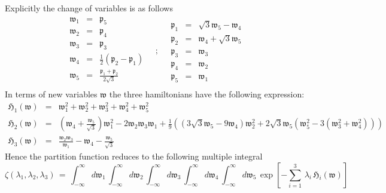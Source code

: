 \documentclass[10pt,a4paper]{article}
\begin{document}
 Explicitly the change of variables is as follows
 \begin{equation}\label{farfullo}
   \begin{array}{ccc}
      \mathfrak{w}_1 & = & \mathfrak{p}_5 \\
      \mathfrak{w}_2 & = & \mathfrak{p}_4 \\
      \mathfrak{w}_3 & = & \mathfrak{p}_3 \\
      \mathfrak{w}_4 & = & \frac{1}{2} \left(\mathfrak{p}_2-\mathfrak{p}_1\right) \\
      \mathfrak{w}_5 & = &  \frac{\mathfrak{p}_1+\mathfrak{p}_2}{2 \sqrt{3}} \\
      \end{array} \quad ; \quad
      \begin{array}{ccc}
      \mathfrak{p}_1 & = & \sqrt{3} \mathfrak{w}_5-\mathfrak{w}_4 \\
      \mathfrak{p}_2  & = & \mathfrak{w}_4+\sqrt{3} \mathfrak{w}_5 \\
      \mathfrak{p}_3  & = & \mathfrak{w}_3 \\
      \mathfrak{p}_4  & = & \mathfrak{w}_2 \\
      \mathfrak{p}_5  & = & \mathfrak{w}_1
    \end{array}
 \end{equation}
 In terms of new variables $\mathfrak{w}$ the three hamiltonians have the following expression:
\begin{eqnarray}\label{whamil}
   \mathfrak{H}_1(\boldsymbol{\mathfrak{w}}) &=& \mathfrak{w}_1^2+\mathfrak{w}_2^2+\mathfrak{w}_3^2+\mathfrak{w}_4^2+\mathfrak{w}_5^2 \nonumber\\
   \mathfrak{H}_2(\boldsymbol{\mathfrak{w}}) &=& \left(\mathfrak{w}_4+\frac{\mathfrak{w}_5}{\sqrt{3}}\right) \mathfrak{w}_1^2-2
   \mathfrak{w}_2 \mathfrak{w}_3 \mathfrak{w}_1+\frac{1}{9} \left(\left(3 \sqrt{3}
   \mathfrak{w}_5-9 \mathfrak{w}_4\right) \mathfrak{w}_2^2+2 \sqrt{3} \mathfrak{w}_5
   \left(\mathfrak{w}_5^2-3
   \left(\mathfrak{w}_3^2+\mathfrak{w}_4^2\right)\right)\right) \nonumber\\
   \mathfrak{H}_3(\boldsymbol{\mathfrak{w}}) &=& \frac{\mathfrak{w}_2
   \mathfrak{w}_3}{\mathfrak{w}_1}-\mathfrak{w}_4-\frac{\mathfrak{w}_5}{\sqrt{3}}
 \end{eqnarray}
 Hence the partition function reduces to the following multiple integral
 \begin{equation}\label{moltiplico}
   \zeta(\lambda_1,\lambda_2,\lambda_3) \, = \, \int_{-\infty}^{\infty} d\mathfrak{w}_1\,\int_{-\infty}^{\infty} d\mathfrak{w}_2
   \,\int_{-\infty}^{\infty} d\mathfrak{w}_3\,\int_{-\infty}^{\infty} d\mathfrak{w}_4\,\int_{-\infty}^{\infty} d\mathfrak{w}_5 \,
   \exp\left[-\sum_{i=1}^3 \,\lambda_i \,\mathfrak{H}_i(\boldsymbol{\mathfrak{w}}) \right]
 \end{equation}
\end{document}
